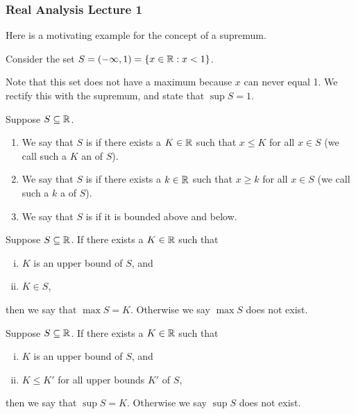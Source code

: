 \documentclass[main.tex]{subfiles}
\begin{document}
\subsubsection{Real Analysis Lecture 1}

Here is a motivating example for the concept of a supremum.
\begin{example}
    Consider the set $S = (-\infty , 1) = \{x\in \mathbb R : x < 1\}$.
\end{example}

Note that this set does not have a maximum because $x$ can never equal 1. We rectify this with the supremum, and state that $\sup S = 1$.

\begin{definition}
    Suppose $S \subseteq \mathbb R$.
    \begin{enumerate}
        \item We say that $S$ is  if there exists a $K\in \mathbb R$ such that $x \le K$ for all $x\in S$ (we call such a $K$ an  of $S$).
        \item We say that $S$ is  if there exists a $k\in \mathbb R$ such that $x\ge k$ for all $x\in S$ (we call such a $k$ a  of $S$).
        \item We say that $S$ is  if it is bounded above and below.
    \end{enumerate}
\end{definition}

\begin{definition}[Maximum]
    Suppose $S\subseteq \mathbb R$. If there exists a $K\in \mathbb R$ such that
    \begin{enumerate}[(i)]
        \item $K$ is an upper bound of $S$, and
        \item $K\in S$,
    \end{enumerate}
    then we say that $\max S = K$. Otherwise we say $\max S$ does not exist.
\end{definition}

\begin{definition}[Supremum]
    Suppose $S\subseteq \mathbb R$. If there exists a $K\in \mathbb R$ such that
    \begin{enumerate}[(i)]
        \item $K$ is an upper bound of $S$, and
        \item $K\le K'$ for all upper bounds $K'$ of $S$,
    \end{enumerate}
    then we say that $\sup S = K$. Otherwise we say $\sup S$ does not exist.
\end{definition}
\end{document}
